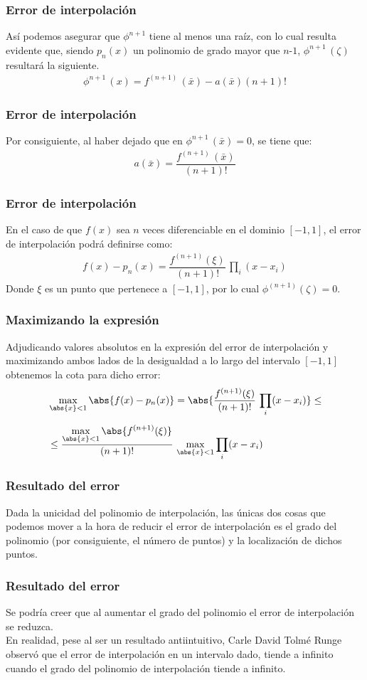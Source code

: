 \begin{frame}
\frametitle{Error de interpolación}
Así podemos asegurar que $\phi^{n+1}$ tiene al menos una raíz, con lo cual resulta evidente que, siendo $p_{n}(x)$ un polinomio de grado mayor que $n‐1$, $\phi^{n+1} \, (\zeta)$ resultará la siguiente.
\begin{align*}
\phi^{n+1} \, (x) = f^{(n+1)} \, (\bar{x}) - a (\bar{x}) (n + 1)!
\end{align*}
\end{frame}
\begin{frame}
\frametitle{Error de interpolación}
Por consiguiente, al haber dejado que en $\phi^{n+1} \, (\bar{x}) = 0$, se tiene que:
\begin{align*}
a (\bar{x}) = \dfrac{f^{(n+1)} \, (\bar{x})}{(n + 1)!}
\end{align*}
\end{frame}
\begin{frame}
\frametitle{Error de interpolación}
En el caso de que $f(x)$ sea $n$ veces diferenciable en el dominio $[-1, 1]$, el error de interpolación podrá definirse como:
\begin{align*}
f(x) - p_{n}(x) = \dfrac{f^{(n+1)}(\xi)}{(n + 1)!} \, \prod_{i} (x - x_{i})
\end{align*}
\pause
Donde $\xi$ es un punto que pertenece a $[-1, 1]$, por lo cual $\phi^{(n+1)}(\zeta) = 0$.
\end{frame}
\begin{frame}
\frametitle{Maximizando la expresión}
Adjudicando valores absolutos en la expresión del error de interpolación y maximizando ambos lados de la desigualdad a lo largo del intervalo $[-1, 1]$ obtenemos la cota para dicho error:
\begin{align*}
&\max_{\abs{x} < 1} \abs{f(x) - p_{n}(x)} = \abs{\dfrac{f^{(n+1)}(\xi)}{(n + 1)!} \, \prod_{i} (x - x_{i})} \leq \\[0.5em]
&\leq \dfrac{\displaystyle \max_{\abs{x} < 1} \abs{f^{(n+1)}(\xi)}}{(n+1)!} \, \max_{\abs{x} < 1} \prod_{i} (x - x_{i})
\end{align*}
\end{frame}
\begin{frame}
\frametitle{Resultado del error}
Dada la unicidad del polinomio de interpolación, las únicas dos cosas que podemos mover a la hora de reducir el error de interpolación es el grado del polinomio (por consiguiente, el número de puntos) y la localización de dichos puntos.
\end{frame}
\begin{frame}
\frametitle{Resultado del error}
Se podría creer que al aumentar el grado del polinomio el error de interpolación se reduzca. 
\\
\bigskip
\pause
En realidad, pese al ser un resultado antiintuitivo, Carle David Tolmé Runge observó que el error de interpolación en un intervalo dado, tiende a infinito cuando el grado del polinomio de interpolación tiende a infinito.
\end{frame}

